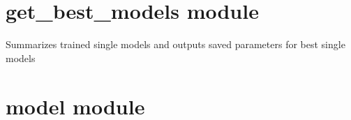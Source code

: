 \documentclass[letterpaper,10pt,english]{sphinxmanual}
\begin{document}
\sphinxstepscope


\section{get\_best\_models module}
\label{\detokenize{get_best_models:module-get_best_models}}\label{\detokenize{get_best_models:get-best-models-module}}\label{\detokenize{get_best_models::doc}}

\begin{fulllineitems}
\label{\detokenize{get_best_models:get_best_models.main}}
\pysigstartsignatures
{}
\pysigstopsignatures
\sphinxAtStartPar
Summarizes trained single models and outputs saved parameters for best single models

\end{fulllineitems}


\sphinxstepscope


\section{model module}
\label{\detokenize{model:module-model}}\label{\detokenize{model:model-module}}\label{\detokenize{model::doc}}
\end{document}
